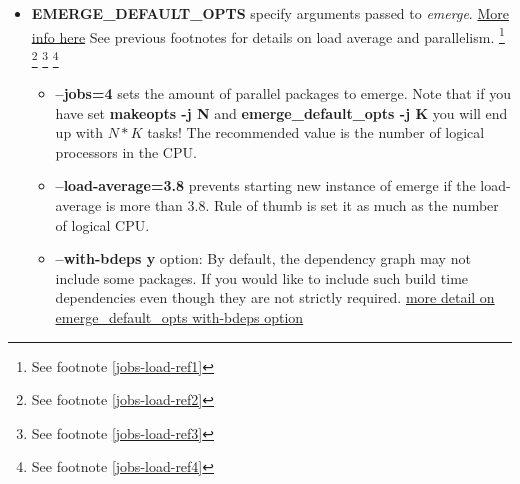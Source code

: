 \documentclass[10pt,a4paper]{article}
\begin{document}
\begin{itemize}
\begin{itemize}[label={o}]
                    \item \textbf{--jobs=4} defines how many parallel sessions to trigger, if they are possible. The recommended value is the number of logical processors in the CPU. You can obtain that number with the following command
                    
\begin{lstlisting}[style=BashInputUser]
user$ nproc --all
\end{lstlisting}
                    
                    \item \textbf{--load-average=3.8} option: This option prevents starting new installations if the load-average is more than $ 3.8 $. It is recommend your load-average to be as much as the number of logical CPU.
                    
                \end{itemize}     
                
                \item \textbf{EMERGE\_DEFAULT\_OPTS} specify arguments passed to \textit{emerge}. \href{https://wiki.gentoo.org/wiki/EMERGE_DEFAULT_OPTS}{More info here} See previous footnotes for details on load average and parallelism. 
                \footnote{ See footnote \ref{jobs-load-ref1}}
                \footnote{ See footnote \ref{jobs-load-ref2}}
                \footnote{ See footnote \ref{jobs-load-ref3}}
                \footnote{ See footnote \ref{jobs-load-ref4}} 


            
                \begin{itemize}[label={o}]
                    \item \textbf{--jobs=4} sets the amount of parallel packages to emerge. Note that if you have set \textbf{makeopts -j N} and \textbf{emerge\_default\_opts -j K} you will end up with $ N*K $ tasks! The recommended value is the number of logical processors in the CPU.
                    
                    \item \textbf{--load-average=3.8} prevents starting new instance of emerge if the load-average is more than $ 3.8 $. Rule of thumb is set it as much as the number of logical CPU.
                    
                    \item \textbf{--with-bdeps y} option: By default, the dependency graph may not include some packages. If you would like to include such build time dependencies even though they are not strictly required. \href{https://wiki.gentoo.org/wiki/Project:Portage/FAQ\#Why_is_it_that_emerge_does_not_update_all_packages.3F}{more detail on emerge\_default\_opts with-bdeps option}
                    

\end{itemize}
\end{itemize}
\end{document}
